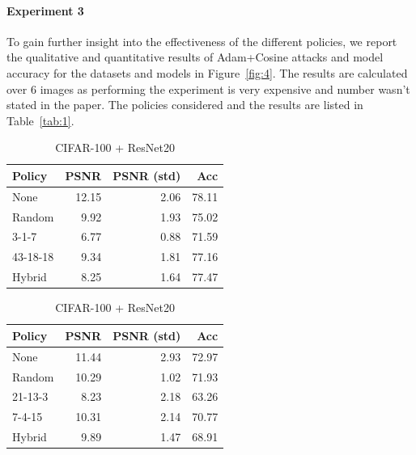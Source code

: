 \paragraph{Experiment 3}

To gain further insight into the effectiveness of the different policies, we report the qualitative and quantitative results of Adam+Cosine attacks and model accuracy for the datasets and models in Figure~\ref{fig:4}. The results are calculated over $6$ images as performing the experiment is very expensive and number wasn't stated in the paper. The policies considered and the results are listed in Table~\ref{tab:1}.
\begin{center}
\begin{table}[h]
    \begin{subtable}[h]{0.25\textwidth}
      \begin{tabular}{lrrr}
            \hline
             Policy   &   PSNR &   PSNR (std) &   Acc \\
            \hline
             None     &       12.15 &       2.06 & 78.11 \\
             Random   &        9.92 &       1.93 & 75.02 \\
             3-1-7    &        6.77 &       0.88 & 71.59 \\
             43-18-18 &        9.34 &       1.81 & 77.16 \\
             Hybrid   &        8.25 &       1.64 & 77.47 \\
            \hline
        \end{tabular}
        \caption{CIFAR-100 + ResNet20}
    \end{subtable}
    \hspace{35mm}%
    \begin{subtable}[h]{0.25\textwidth}
        \begin{tabular}{lrrr}
            \hline
             Policy   &   PSNR &   PSNR (std) &   Acc \\
            \hline
             None     &       11.44 &       2.93 & 72.97 \\
             Random   &       10.29 &       1.02 & 71.93 \\
             21-13-3  &        8.23 &       2.18 & 63.26 \\
             7-4-15   &       10.31 &       2.14 & 70.77 \\
             Hybrid   &        9.89 &       1.47 & 68.91 \\
            \hline
        \end{tabular}

\end{subtable}
\end{table}
\end{center}
